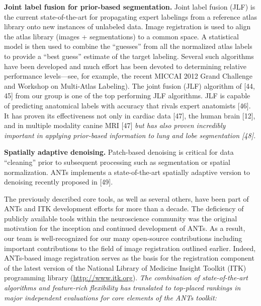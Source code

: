 \documentclass[11pt,]{article}
\begin{document}
\textbf{Joint label fusion for prior-based segmentation.} Joint label
fusion (JLF) is the current state-of-the-art for propagating expert
labelings from a reference atlas library onto new instances of unlabeled
data. Image registration is used to align the atlas library (images +
segmentations) to a common space. A statistical model is then used to
combine the ``guesses'' from all the normalized atlas labels to provide
a ``best guess'' estimate of the target labeling. Several such
algorithms have been developed and much effort has been devoted to
determining relative performance levels---see, for example, the recent
MICCAI 2012 Grand Challenge and Workshop on Multi-Atlas Labeling). The
joint fusion (JLF) algorithm of {[}44, 45{]} from our group is one of
the top performing JLF algorithms. JLF is capable of predicting
anatomical labels with accuracy that rivals expert anatomists {[}46{]}.
It has proven its effectiveness not only in cardiac data {[}47{]}, the
human brain {[}12{]}, and in multiple modality canine MRI {[}47{]}
\emph{but has also proven incredibly important in applying prior-based
information to lung and lobe segmentation {[}48{]}.}

\textbf{Spatially adaptive denoising.} Patch-based denoising is critical
for data ``cleaning'' prior to subsequent processing such as
segmentation or spatial normalization. ANTs implements a
state-of-the-art spatially adaptive version to denoising recently
proposed in {[}49{]}.

The previously described core tools, as well as several others, have
been part of ANTs and ITK development efforts for more than a decade.
The deficiency of publicly available tools within the neuroscience
community was the original motivation for the inception and continued
development of ANTs. As a result, our team is well-recognized for our
many open-source contributions including important contributions to the
field of image registration outlined earlier. Indeed, ANTs-based image
registration serves as the basis for the registration component of the
latest version of the National Library of Medicine Insight Toolkit (ITK)
programming library (\url{http://www.itk.org}). \emph{The combination of
state-of-the-art algorithms and feature-rich flexibility has translated
to top-placed rankings in major independent evaluations for core
elements of the ANTs toolkit:}
\end{document}
